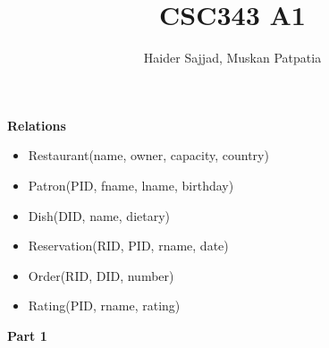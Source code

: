 \documentclass{article}
\begin{document}
\title{CSC343 A1}
\author{Haider Sajjad, Muskan Patpatia}
\maketitle

\begin{LARGE}
\textbf{Relations}
\end{LARGE}

\begin{itemize}
\item Restaurant(name, owner, capacity, country)
\item Patron(PID, fname, lname, birthday)
\item Dish(DID, name, dietary)
\item Reservation(RID, PID, rname, date)
\item Order(RID, DID, number)
\item Rating(PID, rname, rating)
\end{itemize}


\begin{LARGE}
\textbf{Part 1}
\end{LARGE}
\end{document}

